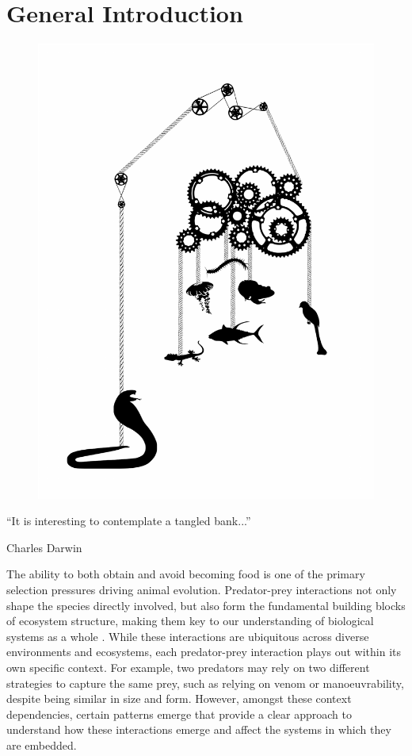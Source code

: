 \chapter{General Introduction}
\label{chap:introduction}


\begin{figure}[h]
  \centering
  \includegraphics[width=.55\textwidth]{ch1-introduction/snake_complexity.pdf}
\end{figure}

\begin{quoteshrink}
  ``It is interesting to contemplate a tangled bank...''

\hfill{Charles Darwin}
\end{quoteshrink}


\noindent
The ability to both obtain and avoid becoming food is one of the primary selection pressures driving animal evolution. Predator-prey interactions not only shape the species directly involved, but also form the fundamental building blocks of ecosystem structure, making them key to our understanding of biological systems as a whole \citep{pimm1984complexity,cohen1990community}. While these interactions are ubiquitous across diverse environments and ecosystems, each predator-prey interaction plays out within its own specific context. For example, two predators may rely on two different strategies to capture the same prey, such as relying on venom or manoeuvrability, despite being similar in size and form. However, amongst these context dependencies, certain patterns emerge that provide a clear approach to understand how these interactions emerge and affect the systems in which they are embedded.


